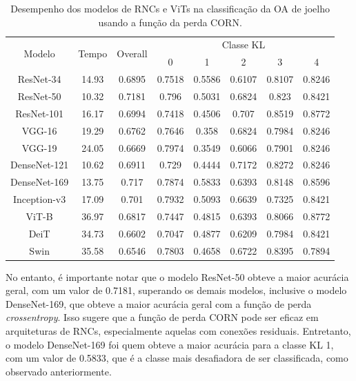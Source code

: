 \begin{table}
    \centering
    \begin{tabular}{|c|c|c|c|c|c|c|c|}
        \hline
        \multirow{2}{*}{Modelo} & \multirow{2}{*}{Tempo} & \multirow{2}{*}{Overall} & \multicolumn{5}{|c|}{Classe KL} \\ \cline{4-8}
        &  &  & 0 & 1 & 2 & 3 & 4 \\ \hline
        ResNet-34 & 14.93 & 0.6895 & 0.7518 & 0.5586 & 0.6107 & 0.8107 & 0.8246 \\ \hline
        ResNet-50 & 10.32 & 0.7181 & 0.796 & 0.5031 & 0.6824 & 0.823 & 0.8421 \\ \hline
        ResNet-101 & 16.17 & 0.6994 & 0.7418 & 0.4506 & 0.707 & 0.8519 & 0.8772 \\ \hline
        VGG-16 & 19.29 & 0.6762 & 0.7646 & 0.358 & 0.6824 & 0.7984 & 0.8246 \\ \hline
        VGG-19 & 24.05 & 0.6669 & 0.7974 & 0.3549 & 0.6066 & 0.7901 & 0.8246 \\ \hline
        DenseNet-121 & 10.62 & 0.6911 & 0.729 & 0.4444 & 0.7172 & 0.8272 & 0.8246 \\ \hline
        DenseNet-169 & 13.75 & 0.717 & 0.7874 & 0.5833 & 0.6393 & 0.8148 & 0.8596 \\ \hline
        Inception-v3 & 17.09 & 0.701 & 0.7932 & 0.5093 & 0.6639 & 0.7325 & 0.8421 \\ \hline
        ViT-B & 36.97 & 0.6817 & 0.7447 & 0.4815 & 0.6393 & 0.8066 & 0.8772 \\ \hline
        DeiT & 34.73 & 0.6602 & 0.7047 & 0.4877 & 0.6209 & 0.7984 & 0.8421 \\ \hline
        Swin & 35.58 & 0.6546 & 0.7803 & 0.4658 & 0.6722 & 0.8395 & 0.7894 \\ \hline
    \end{tabular}
    \caption{Desempenho dos modelos de RNCs e ViTs na classificação da OA de joelho usando a função da perda CORN.}
    \label{tab:resultados-corn}
    \end{table}

No entanto, é importante notar que o modelo ResNet-50 obteve a maior acurácia geral, com um valor de 0.7181, superando os demais modelos, inclusive o modelo DenseNet-169, que obteve a maior acurácia geral com a função de perda \textit{crossentropy}. Isso sugere que a função de perda CORN pode ser eficaz em arquiteturas de RNCs, especialmente aquelas com conexões residuais. Entretanto, o modelo DenseNet-169 foi quem obteve a maior acurácia para a classe KL 1, com um valor de 0.5833, que é a classe mais desafiadora de ser classificada, como observado anteriormente.